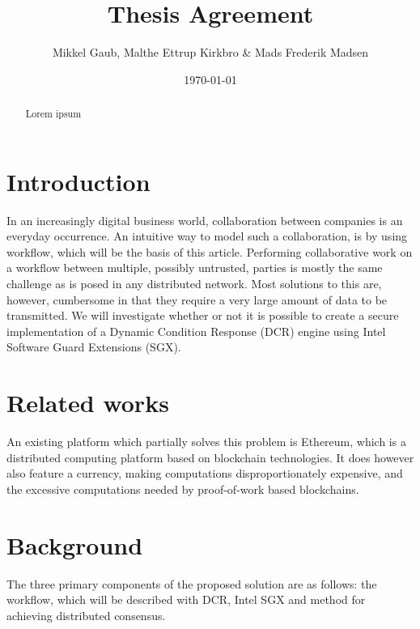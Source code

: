 \documentclass{article}
\author{Mikkel Gaub, Malthe Ettrup Kirkbro \& Mads Frederik Madsen}
\title{Thesis Agreement}
\date{\today}
\begin{document}
\maketitle
\thispagestyle{empty}

\vspace{\fill}

\begin{abstract}
Lorem ipsum
\end{abstract}

\pagebreak

\tableofcontents

\pagebreak

	\section{Introduction}

	In an increasingly digital business world, collaboration between companies is an everyday occurrence.
	An intuitive way to model such a collaboration, is by using workflow, which will be the basis of this article.
	Performing collaborative work on a workflow between multiple, possibly untrusted, parties is mostly the same challenge as is posed in any distributed network. 
	Most solutions to this are, however, cumbersome in that they require a very large amount of data to be transmitted.
	We will investigate whether or not it is possible to create a secure implementation of a Dynamic Condition Response\cite{dcr-paper} (DCR) engine using Intel Software Guard Extensions\cite{intel-sgx-explained} (SGX).

	\section{Related works}

	An existing platform which partially solves this problem is Ethereum\cite{ethereum-white-paper}, which is a distributed computing platform based on blockchain technologies.
	It does however also feature a currency, making computations disproportionately expensive, and the excessive computations needed by proof-of-work based blockchains.

	\section{Background}

	The three primary components of the proposed solution are as follows: the workflow, which will be described with DCR, Intel SGX and method for achieving distributed consensus.
\end{document}
